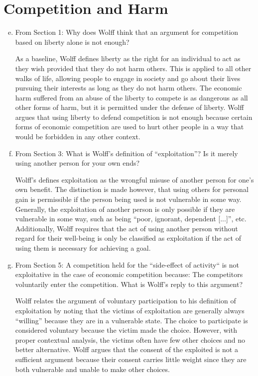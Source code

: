 \documentclass{article}
\begin{document}
\section*{Competition and Harm}
\begin{enumerate}[a)]
  \setcounter{enumi}{4}
  \item From Section 1: Why does Wolff think that an argument for competition based on liberty alone is not enough?
  \par As a baseline, Wolff defines liberty as the right for an individual to act as they wish provided that they do not harm others. This is applied to all other walks of life, allowing people to engage in society and go about their lives pursuing their interests as long as they do not harm others. The economic harm suffered from an abuse of the liberty to compete is as dangerous as all other forms of harm, but it is permitted under the defense of liberty. Wolff argues that using liberty to defend competition is not enough because certain forms of economic competition are used to hurt other people in a way that would be forbidden in any other context.
  \item From Section 3: What is Wolff's definition of ``exploitation''? Is it merely using another person for your own ends?
  \par Wolff's defines exploitation as the wrongful misuse of another person for one's own benefit. The distinction is made however, that using others for personal gain is permissible if the person being used is not vulnerable in some way. Generally, the exploitation of another person is only possible if they are vulnerable in some way, such as being ``poor, ignorant, dependent [...]'', etc. Additionally, Wolff requires that the act of using another person without regard for their well-being is only be classified as exploitation if the act of using them is necessary for achieving a goal.
  \item From Section 5: A competition held for the ``side-effect of activity`` is not exploitative in the case of economic competition because: The competitors voluntarily enter the competition. What is Wolff's reply to this argument?
  \par Wolff relates the argument of voluntary participation to his definition of exploitation by noting that the victims of exploitation are generally always ``willing'' because they are in a vulnerable state. The choice to participate is considered voluntary because the victim made the choice. However, with proper contextual analysis, the victims often have few other choices and no better alternative. Wolff argues that the consent of the exploited is not a sufficient argument because their consent carries little weight since they are both vulnerable and unable to make other choices.

\end{enumerate}
\end{document}
